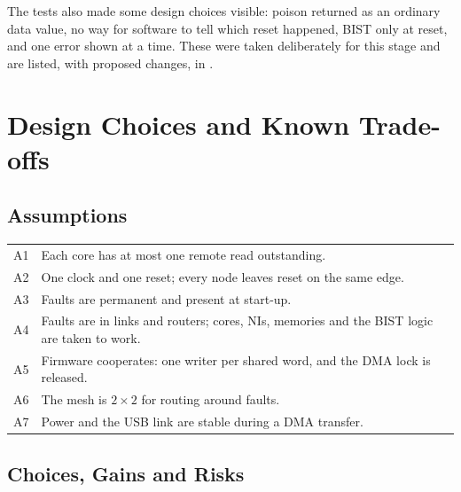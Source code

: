 \documentclass[11pt,a4paper]{article}
\newcommand{\code}[1]{\texttt{\detokenize{#1}}}
\begin{document}
The tests also made some design choices visible: poison returned as an
ordinary data value, no way for software to tell which reset happened, BIST
only at reset, and one error shown at a time. These were taken deliberately
for this stage and are listed, with proposed changes, in
\code{todo/hw_changes.md}.

\section{Design Choices and Known Trade-offs}
\label{sec:choices}

\subsection{Assumptions}

\begin{tabularx}{\textwidth}{@{}lY@{}}
\toprule
A1 & Each core has at most one remote read outstanding. \\
A2 & One clock and one reset; every node leaves reset on the same edge. \\
A3 & Faults are permanent and present at start-up. \\
A4 & Faults are in links and routers; cores, NIs, memories and the BIST logic
are taken to work. \\
A5 & Firmware cooperates: one writer per shared word, and the DMA lock is
released. \\
A6 & The mesh is $2\times2$ for routing around faults. \\
A7 & Power and the USB link are stable during a DMA transfer. \\
\bottomrule
\end{tabularx}

\subsection{Choices, Gains and Risks}
\end{document}
